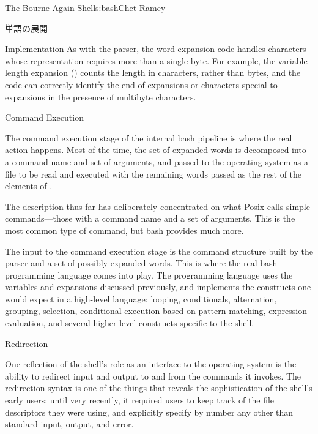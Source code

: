 \begin{aosachapter}{The Bourne-Again Shell}{s:bash}{Chet Ramey}
\begin{aosasect1}{単語の展開}
\begin{aosasect2}{Implementation}
As with the parser, the word expansion code handles characters whose
representation requires more than a single byte.  For example, the
variable length expansion () counts the length in
characters, rather than bytes, and the code can correctly identify the
end of expansions or characters special to expansions in the presence
of multibyte characters.

\end{aosasect2}

\end{aosasect1}

\begin{aosasect1}{Command Execution}

The command execution stage of the internal bash pipeline is where the
real action happens.  Most of the time, the set of expanded words is
decomposed into a command name and set of arguments, and passed to the
operating system as a file to be read and executed with the remaining
words passed as the rest of the elements of .

The description thus far has deliberately concentrated on what Posix
calls simple commands---those with a command name and a set of
arguments.  This is the most common type of command, but bash provides
much more.

The input to the command execution stage is the command structure
built by the parser and a set of possibly-expanded words.  This is
where the real bash programming language comes into play.  The
programming language uses the variables and expansions discussed
previously, and implements the constructs one would expect in a
high-level language: looping, conditionals, alternation, grouping,
selection, conditional execution based on pattern matching, expression
evaluation, and several higher-level constructs specific to the shell.

\begin{aosasect2}{Redirection}

One reflection of the shell's role as an interface to the operating
system is the ability to redirect input and output to and from the
commands it invokes.  The redirection syntax is one of the things that
reveals the sophistication of the shell's early users: until very
recently, it required users to keep track of the file descriptors they
were using, and explicitly specify by number any other than standard
input, output, and error.


\end{aosasect2}
\end{aosasect1}
\end{aosachapter}
